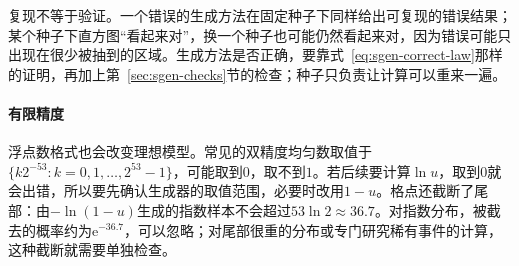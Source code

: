 复现不等于验证。一个错误的生成方法在固定种子下同样给出可复现的错误结果；某个种子下直方图“看起来对”，换一个种子也可能仍然看起来对，因为错误可能只出现在很少被抽到的区域。生成方法是否正确，要靠式~\eqref{eq:sgen-correct-law}那样的证明，再加上第~\ref{sec:sgen-checks}节的检查；种子只负责让计算可以重来一遍。

\paragraph{有限精度}
浮点数格式也会改变理想模型。常见的双精度均匀数取值于$\{k2^{-53}:k=0,1,\dots,2^{53}-1\}$，可能取到$0$，取不到$1$。若后续要计算$\ln u$，取到$0$就会出错，所以要先确认生成器的取值范围，必要时改用$1-u$。格点还截断了尾部：由$-\ln(1-u)$生成的指数样本不会超过$53\ln2\approx36.7$。对指数分布，被截去的概率约为$\mathrm{e}^{-36.7}$，可以忽略；对尾部很重的分布或专门研究稀有事件的计算，这种截断就需要单独检查。
